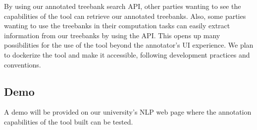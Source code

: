 By using our annotated treebank search API, other parties wanting to see the capabilities of the tool can retrieve our annotated treebanks.
Also, some parties wanting to use the treebanks in their computation tasks can easily extract information from our treebanks by using the API.
This opens up many possibilities for the use of the tool beyond the annotator's UI experience.
We plan to dockerize the tool and make it accessible, following development practices and conventions.

\subsection{Demo}
\label{sec:demo}

A demo will be provided on our university's NLP web page where the annotation capabilities of the tool built can be tested.
